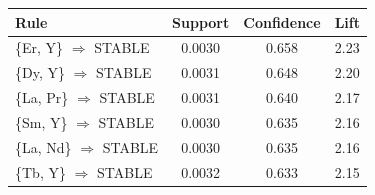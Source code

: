 \begin{tabular}{lccc}
\toprule
Rule & Support & Confidence & Lift\\
\midrule
\{Er, Y\} $\Rightarrow$ STABLE & 0.0030 & 0.658 & 2.23 \\
\{Dy, Y\} $\Rightarrow$ STABLE & 0.0031 & 0.648 & 2.20 \\
\{La, Pr\} $\Rightarrow$ STABLE & 0.0031 & 0.640 & 2.17 \\
\{Sm, Y\} $\Rightarrow$ STABLE & 0.0030 & 0.635 & 2.16 \\
\{La, Nd\} $\Rightarrow$ STABLE & 0.0030 & 0.635 & 2.16 \\
\{Tb, Y\} $\Rightarrow$ STABLE & 0.0032 & 0.633 & 2.15 \\
\bottomrule
\end{tabular}
